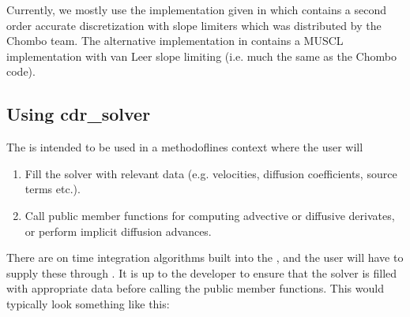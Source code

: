 \documentclass[letterpaper,10pt,english]{sphinxmanual}
\begin{document}
{\hfill{}\hspace*{\fill}}

Currently, we mostly use the implementation given in  which contains a second order accurate discretization with slope limiters which was distributed by the Chombo team.
The alternative implementation in  contains a MUSCL implementation with van Leer slope limiting (i.e. much the same as the Chombo code).


\subsection{Using cdr\_solver}
\label{\detokenize{CDR:using-cdr-solver}}
The  is intended to be used in a method\sphinxhyphen{}of\sphinxhyphen{}lines context where the user will
\begin{enumerate}
%
\item {} 
Fill the solver with relevant data (e.g. velocities, diffusion coefficients, source terms etc.).

\item {} 
Call public member functions for computing advective or diffusive derivates, or perform implicit diffusion advances.

\end{enumerate}

There are on time integration algorithms built into the , and the user will have to supply these through .
It is up to the developer to ensure that the solver is filled with appropriate data before calling the public member functions.
This would typically look something like this:
\end{document}
